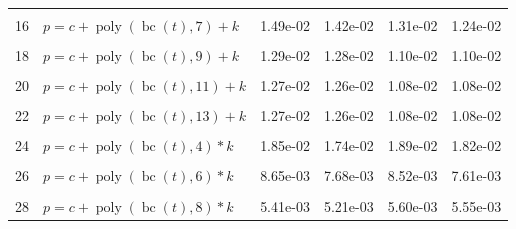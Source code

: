 \documentclass[12pt,a4paper]{article}
\DeclareMathOperator{\bc}{bc}
\DeclareMathOperator{\poly}{poly}
\begin{document}
\begin{longtable}[t]{ll>{\raggedleft\arraybackslash}p{2cm}>{\raggedleft\arraybackslash}p{2cm}>{\raggedleft\arraybackslash}p{2cm}>{\raggedleft\arraybackslash}p{2cm}}
\cellcolor{gray!6}{15} & \cellcolor{gray!6}{$p = c + \poly\left( \bc(t), 6 \right) + k$} & \cellcolor{gray!6}{1.60e-02} & \cellcolor{gray!6}{1.53e-02} & \cellcolor{gray!6}{1.27e-02} & \cellcolor{gray!6}{1.26e-02}\\
16 & $p = c + \poly\left( \bc(t), 7 \right) + k$ & 1.49e-02 & 1.42e-02 & 1.31e-02 & 1.24e-02\\
\cellcolor{gray!6}{17} & \cellcolor{gray!6}{$p = c + \poly\left( \bc(t), 8 \right) + k$} & \cellcolor{gray!6}{1.30e-02} & \cellcolor{gray!6}{1.29e-02} & \cellcolor{gray!6}{1.10e-02} & \cellcolor{gray!6}{1.09e-02}\\
18 & $p = c + \poly\left( \bc(t), 9 \right) + k$ & 1.29e-02 & 1.28e-02 & 1.10e-02 & 1.10e-02\\
\cellcolor{gray!6}{19} & \cellcolor{gray!6}{$p = c + \poly\left( \bc(t), 10 \right) + k$} & \cellcolor{gray!6}{1.28e-02} & \cellcolor{gray!6}{1.28e-02} & \cellcolor{gray!6}{1.09e-02} & \cellcolor{gray!6}{1.09e-02}\\
20 & $p = c + \poly\left( \bc(t), 11 \right) + k$ & 1.27e-02 & 1.26e-02 & 1.08e-02 & 1.08e-02\\
\cellcolor{gray!6}{21} & \cellcolor{gray!6}{$p = c + \poly\left( \bc(t), 12 \right) + k$} & \cellcolor{gray!6}{1.27e-02} & \cellcolor{gray!6}{1.26e-02} & \cellcolor{gray!6}{1.08e-02} & \cellcolor{gray!6}{1.08e-02}\\
22 & $p = c + \poly\left( \bc(t), 13 \right) + k$ & 1.27e-02 & 1.26e-02 & 1.08e-02 & 1.08e-02\\
\cellcolor{gray!6}{23} & \cellcolor{gray!6}{$p = c + \poly\left( \bc(t), 3 \right) * k$} & \cellcolor{gray!6}{2.77e-02} & \cellcolor{gray!6}{1.74e-02} & \cellcolor{gray!6}{1.82e-02} & \cellcolor{gray!6}{1.72e-02}\\
24 & $p = c + \poly\left( \bc(t), 4 \right) * k$ & 1.85e-02 & 1.74e-02 & 1.89e-02 & 1.82e-02\\
\cellcolor{gray!6}{25} & \cellcolor{gray!6}{$p = c + \poly\left( \bc(t), 5 \right) * k$} & \cellcolor{gray!6}{1.42e-02} & \cellcolor{gray!6}{1.39e-02} & \cellcolor{gray!6}{1.19e-02} & \cellcolor{gray!6}{1.18e-02}\\
26 & $p = c + \poly\left( \bc(t), 6 \right) * k$ & 8.65e-03 & 7.68e-03 & 8.52e-03 & 7.61e-03\\
\cellcolor{gray!6}{27} & \cellcolor{gray!6}{$p = c + \poly\left( \bc(t), 7 \right) * k$} & \cellcolor{gray!6}{6.90e-03} & \cellcolor{gray!6}{6.06e-03} & \cellcolor{gray!6}{6.51e-03} & \cellcolor{gray!6}{6.22e-03}\\
28 & $p = c + \poly\left( \bc(t), 8 \right) * k$ & 5.41e-03 & 5.21e-03 & 5.60e-03 & 5.55e-03\\

\end{longtable}
\end{document}
